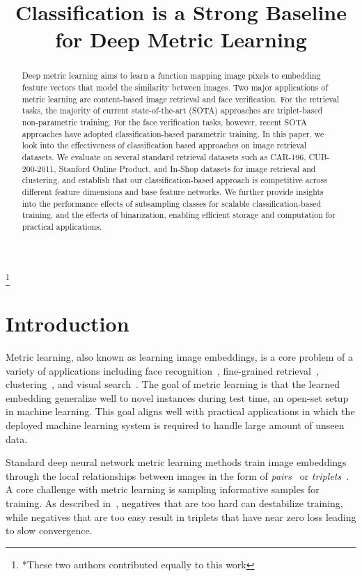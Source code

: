 \documentclass{bmvc2k}
\newcommand\blfootnote[1]{\begingroup
  \renewcommand\thefootnote{}\footnote{#1}\addtocounter{footnote}{-1}\endgroup
}
\begin{document}
\title{Classification is a Strong Baseline for Deep Metric Learning}

\maketitle
\blfootnote{*These two authors contributed equally to this work}

\begin{abstract}
Deep metric learning aims to learn a function mapping image pixels to embedding feature vectors that model the similarity between images. Two major applications of metric learning are content-based image retrieval and face verification. For the retrieval tasks, the majority of current state-of-the-art (SOTA) approaches are triplet-based non-parametric training. For the face verification tasks, however, recent SOTA approaches have adopted classification-based parametric training. In this paper, we look into the effectiveness of classification based approaches on image retrieval datasets. We evaluate on several standard retrieval datasets such as CAR-196, CUB-200-2011, Stanford Online Product, and In-Shop datasets for image retrieval and clustering, and establish that our classification-based approach is competitive across different feature dimensions and base feature networks. We further provide insights into the performance effects of subsampling classes for scalable classification-based training, and the effects of binarization, enabling efficient storage and computation for practical applications.
\end{abstract}


\section{Introduction}
Metric learning, also known as learning image embeddings, is a core problem of a variety of applications including face recognition~\cite{facenet, Liu2017SphereFaceDH,Wang2018AdditiveMS,Wang2018CosFaceLM}, fine-grained retrieval~\cite{songCVPR16,samplingmatters,npairNIPS2016}, clustering~\cite{googleswirl}, and visual search~\cite{visualdiscoverypinterest,jing15,visualsearchalibaba,visualsearchbing}. The goal of metric learning is that the learned embedding generalize well to novel instances during test time, an open-set setup in machine learning. This goal aligns well with practical applications in which the deployed machine learning system is required to handle large amount of unseen data. 

Standard deep neural network metric learning methods train image embeddings through the local relationships between images in the form of \textit{pairs}~\cite{siamese,bell15productnet} or \textit{triplets}~\cite{triplet,facenet}. A core challenge with metric learning is sampling informative samples for training. As described in~\cite{facenet,defensetriplet,samplingmatters}, negatives that are too hard can destabilize training, while negatives that are too easy result in triplets that have near zero loss leading to slow convergence.
\end{document}
